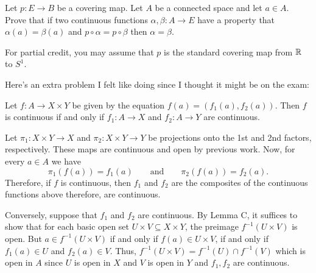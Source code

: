 \begin{problem}
Let $p\colon E\to B$ be a covering map. Let $A$ be a connected space and
let $a\in A$. Prove that if two continuous functions $\alpha,\beta\colon
A\to E$ have a property that $\alpha(a)=\beta(a)$ and
$p\circ\alpha=p\circ\beta$ then $\alpha=\beta$.

For partial credit, you may assume that $p$ is the standard covering map
from $\mathbb{R}$ to $S^1$.
\end{problem}
\begin{solution}
\end{solution}

Here's an extra problem I felt like doing since I thought it might be on
the exam:
\begin{problem*}
\begin{theorem*}
Let $f\colon A\to X\times Y$ be given by the equation
$f(a)=(f_1(a),f_2(a))$. Then $f$ is continuous if and only if
$f_1\colon A\to X$ and $f_2\colon A\to Y$ are continuous.
\end{theorem*}
\end{problem*}
\begin{solution}
Let $\pi_1\colon X\times Y\to X$ and $\pi_2\colon X\times Y\to Y$ be
projections onto the 1st and 2nd factors, respectively. These maps are
continuous and open by previous work. Now, for every $a\in A$ we have
\[
\pi_1(f(a))=f_1(a)\qquad\text{and}\qquad
\pi_2(f(a))=f_2(a).
\]
Therefore, if $f$ is continuous, then $f_1$ and $f_2$ are the composites of
the continuous functions above therefore, are continuous.

Conversely, suppose that $f_1$ and $f_2$ are continuous. By Lemma C, it
suffices to show that for each basic open set $U\times V\subseteq X\times Y$,
the preimage $f^{-1}(U\times V)$ is open. But $a\in f^{-1}(U\times V)$ if
and only if $f(a)\in U\times V$, if and only if $f_1(a)\in U$ and
$f_2(a)\in V$. Thus, $f^{-1}(U\times V)=f^{-1}(U)\cap f^{-1}(V)$ which is
open in $A$ since $U$ is open in $X$ and $V$ is open in $Y$ and $f_1,f_2$
are continuous.
\end{solution}

